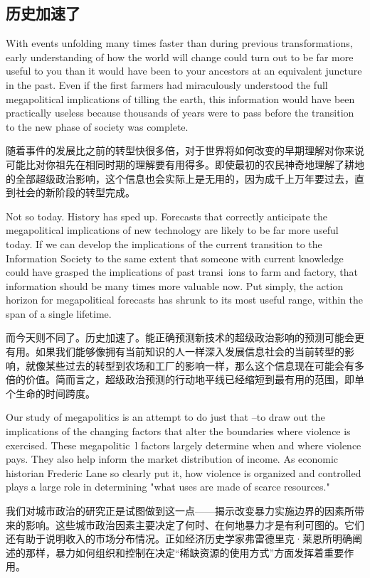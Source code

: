 \subsection{历史加速了}
\begin{paracol}{2}
With events unfolding many times faster than during previous transformations, early understanding of how the world will change could turn out to be far more useful to you than it would have been to your ancestors at an equivalent juncture in the past. Even if the first farmers had miraculously understood the full megapolitical implications of tilling the earth, this information would have been practically useless because thousands of years were to pass before the transition to the new phase of society was complete.

\switchcolumn
随着事件的发展比之前的转型快很多倍，对于世界将如何改变的早期理解对你来说可能比对你祖先在相同时期的理解要有用得多。即使最初的农民神奇地理解了耕地的全部超级政治影响，这个信息也会实际上是无用的，因为成千上万年要过去，直到社会的新阶段的转型完成。

\switchcolumn*
Not so today. History has sped up. Forecasts that correctly anticipate the megapolitical implications of new technology are likely to be far more useful today. If we can develop the implications of the current transition to the Information Society to the same extent that someone with current knowledge could have grasped the implications of past transi~ions to farm and factory, that information should be many times more valuable now. Put simply, the action horizon for megapolitical forecasts has shrunk to its most useful range, within the span of a single lifetime.

\switchcolumn
而今天则不同了。历史加速了。能正确预测新技术的超级政治影响的预测可能会更有用。如果我们能够像拥有当前知识的人一样深入发展信息社会的当前转型的影响，就像某些过去的转型到农场和工厂的影响一样，那么这个信息现在可能会有多倍的价值。简而言之，超级政治预测的行动地平线已经缩短到最有用的范围，即单个生命的时间跨度。

\switchcolumn*
Our study of megapolitics is an attempt to do just that --to draw out the implications of the changing factors that alter the boundaries where violence is exercised. These megapolitic~l factors largely determine when and where violence pays. They also help inform the market distribution of income. As economic historian Frederic Lane so clearly put it, how violence is organized and controlled plays a large role in determining "what uses are made of scarce resources."

\switchcolumn
我们对城市政治的研究正是试图做到这一点——揭示改变暴力实施边界的因素所带来的影响。这些城市政治因素主要决定了何时、在何地暴力才是有利可图的。它们还有助于说明收入的市场分布情况。正如经济历史学家弗雷德里克·莱恩所明确阐述的那样，暴力如何组织和控制在决定“稀缺资源的使用方式”方面发挥着重要作用。

\end{paracol}

